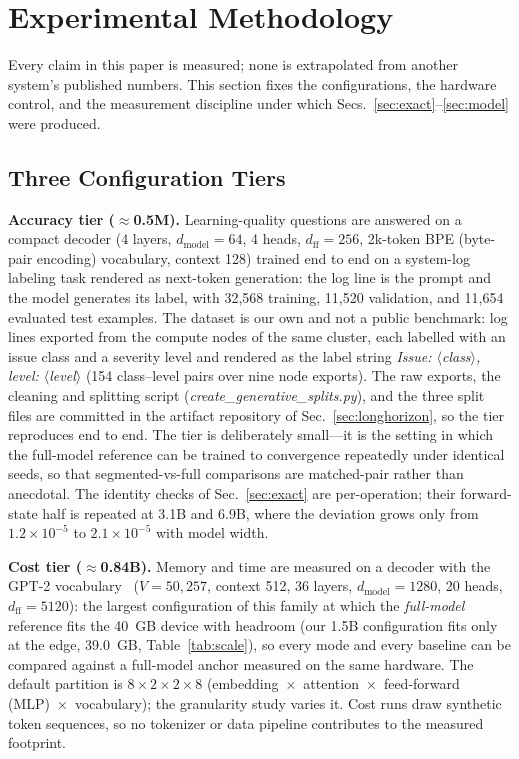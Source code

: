 \documentclass[journal]{IEEEtran}
\begin{document}
\section{Experimental Methodology}\label{sec:method}
Every claim in this paper is measured; none is extrapolated from another
system's published numbers. This section fixes the configurations, the
hardware control, and the measurement discipline under which
Secs.~\ref{sec:exact}--\ref{sec:model} were produced.

\subsection{Three Configuration Tiers}\label{sec:tiers}
\textbf{Accuracy tier (${\approx}$0.5M).} Learning-quality questions are
answered on a compact decoder (4 layers, $d_\text{model}{=}64$, 4 heads,
$d_\text{ff}{=}256$, 2k-token BPE (byte-pair encoding) vocabulary, context 128) trained end to end
on a system-log labeling task rendered as next-token generation: the log line
is the prompt and the model generates its label, with 32{,}568 training,
11{,}520 validation, and 11{,}654 evaluated test examples. The dataset is our
own and not a public benchmark: log lines exported from the compute nodes of
the same cluster, each labelled with an issue class and a severity level and
rendered as the label string \emph{Issue: $\langle$class$\rangle$, level:
$\langle$level$\rangle$} (154 class--level pairs over nine node exports). The
raw exports, the cleaning and splitting script
(\emph{create\_generative\_splits.py}), and the three split files are
committed in the artifact repository of Sec.~\ref{sec:longhorizon}, so the
tier reproduces end to end. The tier is
deliberately small---it is the setting in which the full-model reference can
be trained to convergence repeatedly under identical seeds, so that
segmented-vs-full comparisons are matched-pair rather than anecdotal. The
identity checks of Sec.~\ref{sec:exact} are per-operation; their
forward-state half is repeated at 3.1B and 6.9B, where the deviation grows
only from $1.2{\times}10^{-5}$ to $2.1{\times}10^{-5}$ with model width.

\textbf{Cost tier (${\approx}$0.84B).} Memory and time are measured on a decoder
with the GPT-2 vocabulary~\cite{radford2019gpt2} ($V{=}50{,}257$, context 512, 36 layers,
$d_\text{model}{=}1280$, 20 heads, $d_\text{ff}{=}5120$): the largest configuration of this family at which the \emph{full-model} reference
fits the 40~GB device with headroom (our 1.5B configuration fits only at the
edge, 39.0~GB, Table~\ref{tab:scale}), so every mode and every baseline can
be compared against a full-model anchor measured on the same hardware. The default partition is $8{\times}2{\times}2{\times}8$
(embedding~$\times$~attention~$\times$~feed-forward (MLP)~$\times$~vocabulary); the
granularity study varies it. Cost runs draw synthetic token sequences, so no
tokenizer or data pipeline contributes to the measured footprint.
\end{document}
